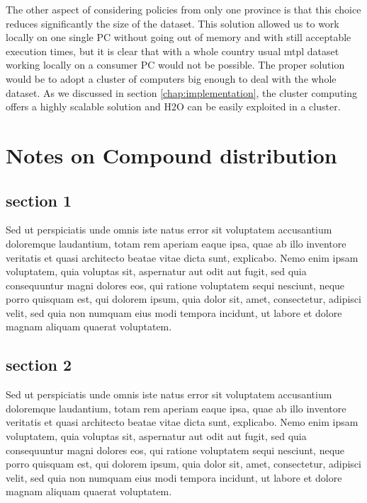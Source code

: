 \documentclass[a4paper, twoside, openright, 12pt]{report}
\theoremstyle{definition}
\theoremstyle{definition}
\theoremstyle{definition}
\theoremstyle{remark}
\begin{document}
The other aspect of considering policies from only one province is that this choice reduces significantly the size of the dataset. This solution allowed us to work locally on one single PC without going out of memory and with still acceptable execution times, but it is clear that with a whole country usual \ac{mtpl} dataset working locally on a consumer PC would not be possible. The proper solution would be to adopt a cluster of computers big enough to deal with the whole dataset. As we discussed in section \ref{chap:implementation}, the cluster computing offers a highly scalable solution and H2O can be easily exploited in a cluster.

\appendix

\hypertarget{notes-on-compound-distribution}{%
\chapter{Notes on Compound distribution}\label{notes-on-compound-distribution}}

\hypertarget{section-1}{%
\section{section 1}\label{section-1}}

Sed ut perspiciatis unde omnis iste natus error sit voluptatem accusantium doloremque laudantium, totam rem aperiam eaque ipsa, quae ab illo inventore veritatis et quasi architecto beatae vitae dicta sunt, explicabo. Nemo enim ipsam voluptatem, quia voluptas sit, aspernatur aut odit aut fugit, sed quia consequuntur magni dolores eos, qui ratione voluptatem sequi nesciunt, neque porro quisquam est, qui dolorem ipsum, quia dolor sit, amet, consectetur, adipisci velit, sed quia non numquam eius modi tempora incidunt, ut labore et dolore magnam aliquam quaerat voluptatem.

\hypertarget{section-2}{%
\section{section 2}\label{section-2}}

Sed ut perspiciatis unde omnis iste natus error sit voluptatem accusantium doloremque laudantium, totam rem aperiam eaque ipsa, quae ab illo inventore veritatis et quasi architecto beatae vitae dicta sunt, explicabo. Nemo enim ipsam voluptatem, quia voluptas sit, aspernatur aut odit aut fugit, sed quia consequuntur magni dolores eos, qui ratione voluptatem sequi nesciunt, neque porro quisquam est, qui dolorem ipsum, quia dolor sit, amet, consectetur, adipisci velit, sed quia non numquam eius modi tempora incidunt, ut labore et dolore magnam aliquam quaerat voluptatem.
\end{document}
